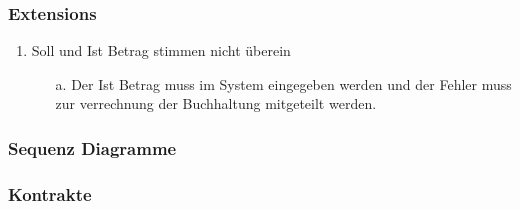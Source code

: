 \documentclass[./detailed_overview_usecases.tex]{subfiles}
\begin{document}
    \subsubsection*{Extensions}
    \begin{enumerate}
        \item Soll und Ist Betrag stimmen nicht überein
        \begin{itemize}
            \item[a.] Der Ist Betrag muss im System eingegeben werden und der Fehler
            muss zur verrechnung der Buchhaltung mitgeteilt werden.
        \end{itemize}
    \end{enumerate}

    \subsubsection{Sequenz Diagramme}
    \subsubsection{Kontrakte}
\end{document}
